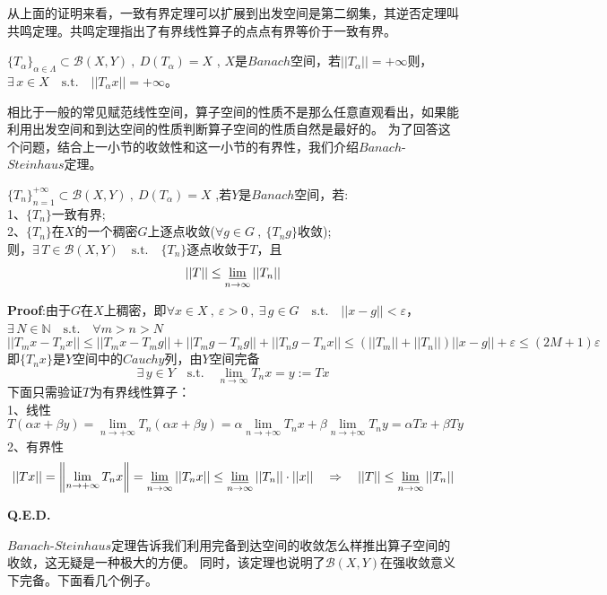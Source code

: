 从上面的证明来看，一致有界定理可以扩展到出发空间是第二纲集，其逆否定理叫共鸣定理。共鸣定理指出了有界线性算子的点点有界等价于一致有界。
\begin{theorem}[共鸣定理]
    $\{T_{\alpha}\}_{\alpha \in \Lambda} \subset \mathscr{B}(X,Y) \ , \ D(T_{\alpha})=X$ , $X$是$Banach$空间，若$||T_{\alpha}||=+\infty$则，$\exists \, x \in X \quad \text{s.t.} \quad ||T_{\alpha}x||=+\infty$。
\end{theorem} 
相比于一般的常见赋范线性空间，算子空间的性质不是那么任意直观看出，如果能利用出发空间和到达空间的性质判断算子空间的性质自然是最好的。
为了回答这个问题，结合上一小节的收敛性和这一小节的有界性，我们介绍$Banach$-$Steinhaus$定理。
\begin{theorem}\label{BS}
    $\{T_n\}_{n=1}^{+\infty} \subset \mathscr{B}(X,Y) \ , \ D(T_{\alpha})=X$ ,若$Y$是$Banach$空间，若:\\
    1、$\{T_n\}$一致有界;\\
    2、$\{T_n\}$在$X$的一个稠密$G$上逐点收敛($\forall g \in G \ , \ \{T_ng\}$收敛);\\
    则，$\exists \, T \in \mathscr{B}(X,Y) \quad \text{s.t.} \quad \{T_n\}$逐点收敛于$T$，且
    \[||T|| \leq \varliminf\limits_{n\to\infty}||T_n||\]
\end{theorem} 
\textbf{Proof}:由于$G$在$X$上稠密，即$\forall x \in X \ , \ \varepsilon>0\ , \ \exists \, g \in G \quad \text{s.t.} \quad ||x-g||<\varepsilon$，$\exists \, N \in \mathbb{N} \quad \text{s.t.} \quad \forall m>n>N$
\[||T_mx-T_nx|| \leq ||T_mx-T_mg||+||T_mg-T_ng||+||T_ng-T_nx|| \leq \left(||T_m||+||T_n||\right)||x-g||+\varepsilon \leq (2M+1)\varepsilon\]
即$\{T_nx\}$是$Y$空间中的$Cauchy$列，由$Y$空间完备
\[\exists \, y \in Y \quad \text{s.t.} \quad \lim_{n \to \infty}T_nx=y:=Tx\]
下面只需验证$T$为有界线性算子：\\
1、线性
\[T(\alpha x+\beta y)=\lim_{n \to +\infty}T_n(\alpha x+\beta y)=\alpha\lim_{n \to +\infty}T_nx+\beta\lim_{n \to +\infty}T_ny=\alpha Tx+\beta Ty\]
2、有界性
\[||Tx||=\left\|\lim_{n \to +\infty}T_nx\right\|=\varliminf\limits_{n\to\infty}||T_nx|| \leq \varliminf\limits_{n\to\infty}||T_n|| \cdot ||x|| \quad \Rightarrow \quad ||T|| \leq \varliminf\limits_{n\to\infty}||T_n||\]

\textbf{Q.E.D.}

$Banach$-$Steinhaus$定理告诉我们利用完备到达空间的收敛怎么样推出算子空间的收敛，这无疑是一种极大的方便。
同时，该定理也说明了$\mathscr{B}(X,Y)$在强收敛意义下完备。下面看几个例子。

